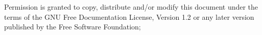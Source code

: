 \thispagestyle{empty}

\begin{vplace}[0.7]

\vspace{1cm}

Permission is granted to copy, distribute and/or modify this document under the terms
of the GNU Free Documentation License, Version 1.2 or any later version published by
the Free Software Foundation;


\vspace{1cm}

\webpageurl{}
\end{vplace}
